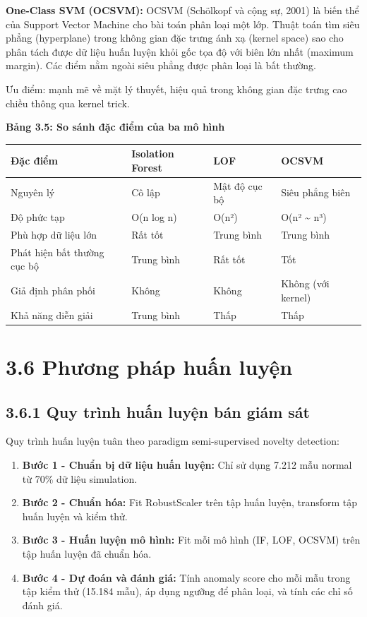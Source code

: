 \documentclass[
  a4paper]{report}
\newcounter{none} %
\providecommand{\tightlist}{%
  \setlength{\itemsep}{0pt}\setlength{\parskip}{0pt}}
\begin{document}
\textbf{One-Class SVM (OCSVM):} OCSVM (Schölkopf và cộng sự, 2001) là
biến thể của Support Vector Machine cho bài toán phân loại một lớp.
Thuật toán tìm siêu phẳng (hyperplane) trong không gian đặc trưng ánh xạ
(kernel space) sao cho phân tách được dữ liệu huấn luyện khỏi gốc tọa độ
với biên lớn nhất (maximum margin). Các điểm nằm ngoài siêu phẳng được
phân loại là bất thường.

Ưu điểm: mạnh mẽ về mặt lý thuyết, hiệu quả trong không gian đặc trưng
cao chiều thông qua kernel trick.

\textbf{Bảng 3.5: So sánh đặc điểm của ba mô hình}

{\def\LTcaptype{none} %
\begin{longtable}[]{@{}llll@{}}
\toprule\noalign{}
Đặc điểm & Isolation Forest & LOF & OCSVM \\
\midrule\noalign{}
\endhead
\bottomrule\noalign{}
\endlastfoot
Nguyên lý & Cô lập & Mật độ cục bộ & Siêu phẳng biên \\
Độ phức tạp & O(n log n) & O(n²) & O(n² \textasciitilde{} n³) \\
Phù hợp dữ liệu lớn & Rất tốt & Trung bình & Trung bình \\
Phát hiện bất thường cục bộ & Trung bình & Rất tốt & Tốt \\
Giả định phân phối & Không & Không & Không (với kernel) \\
Khả năng diễn giải & Trung bình & Thấp & Thấp \\
\end{longtable}
}

\section{3.6 Phương pháp huấn
luyện}\label{phux1b0ux1a1ng-phuxe1p-huux1ea5n-luyux1ec7n}

\subsection{3.6.1 Quy trình huấn luyện bán giám
sát}\label{quy-truxecnh-huux1ea5n-luyux1ec7n-buxe1n-giuxe1m-suxe1t}

Quy trình huấn luyện tuân theo paradigm semi-supervised novelty
detection:

\begin{enumerate}
\def\labelenumi{\arabic{enumi}.}
\tightlist
\item
  \textbf{Bước 1 - Chuẩn bị dữ liệu huấn luyện:} Chỉ sử dụng 7.212 mẫu
  normal từ 70\% dữ liệu simulation.
\item
  \textbf{Bước 2 - Chuẩn hóa:} Fit RobustScaler trên tập huấn luyện,
  transform tập huấn luyện và kiểm thử.
\item
  \textbf{Bước 3 - Huấn luyện mô hình:} Fit mỗi mô hình (IF, LOF, OCSVM)
  trên tập huấn luyện đã chuẩn hóa.
\item
  \textbf{Bước 4 - Dự đoán và đánh giá:} Tính anomaly score cho mỗi mẫu
  trong tập kiểm thử (15.184 mẫu), áp dụng ngưỡng để phân loại, và tính
  các chỉ số đánh giá.
\end{enumerate}
\end{document}
